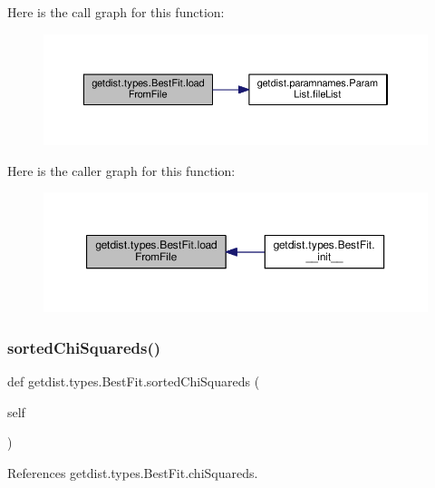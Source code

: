 Here is the call graph for this function\+:
\nopagebreak
\begin{figure}[H]
\begin{center}
\leavevmode
\includegraphics[width=350pt]{classgetdist_1_1types_1_1BestFit_a1f93055bc0ccff2dcf47aa1b671b1eac_cgraph}
\end{center}
\end{figure}
Here is the caller graph for this function\+:
\nopagebreak
\begin{figure}[H]
\begin{center}
\leavevmode
\includegraphics[width=350pt]{classgetdist_1_1types_1_1BestFit_a1f93055bc0ccff2dcf47aa1b671b1eac_icgraph}
\end{center}
\end{figure}
\mbox{\label{classgetdist_1_1types_1_1BestFit_a60ea86249e13c8869609065b5fc89228}} 
\subsubsection{\texorpdfstring{sorted\+Chi\+Squareds()}{sortedChiSquareds()}}
{\footnotesize\ttfamily def getdist.\+types.\+Best\+Fit.\+sorted\+Chi\+Squareds (\begin{DoxyParamCaption}\item[{}]{self }\end{DoxyParamCaption})}



References getdist.\+types.\+Best\+Fit.\+chi\+Squareds.

